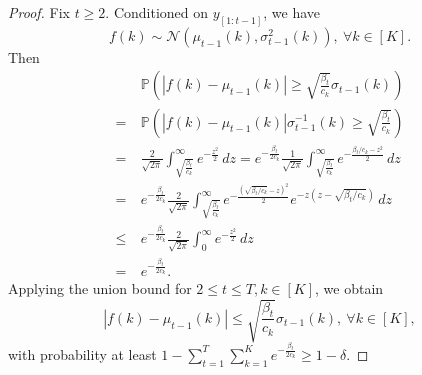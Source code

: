 \documentclass[letterpaper]{vldb}
\newcommand{\cN}{\mathcal{N}}
\newcommand{\bP}{\mathbb{P}} %
\begin{document}
\begin{proof}
  Fix $t\ge 2$. Conditioned on $y_{[1:t-1]}$, we have
  \[
    f(k) \sim \cN(\mu_{t-1}(k), \sigma^2_{t-1}(k)), \ \forall k\in [K].
  \]
  Then
  \begin{align*}
    & \bP\left(|f(k)- \mu_{t-1}(k)| \ge \sqrt{\frac{\beta_t}{c_k}}\sigma_{t-1}(k)\right)\\
    =\ & \bP\left(|f(k)- \mu_{t-1}(k)|\sigma^{-1}_{t-1}(k) \ge \sqrt{\frac{\beta_t}{c_k}}\right)\\
    =\ & \frac{2}{\sqrt{2\pi}}\int_{\sqrt{\frac{\beta_t}{c_k}}}^\infty e^{-\frac{z^2}{2}}\, dz = e^{-\frac{\beta_t}{2c_k}} \frac{1}{\sqrt{2\pi}}\int_{\sqrt{\frac{\beta_t}{c_k}}}^\infty e^{-\frac{\beta_t/c_k-z^2}{2}}\, dz\\
    =\ & e^{-\frac{\beta_t}{2c_k}} \frac{2}{\sqrt{2\pi}}\int_{\sqrt{\frac{\beta_t}{c_k}}}^\infty e^{-\frac{(\sqrt{\beta_t/c_k}-z)^2}{2}}e^{-z(z-\sqrt{\beta_t/c_k})}\, dz\\
    \le \ & e^{-\frac{\beta_t}{2c_k}} \frac{2}{\sqrt{2\pi}} \int_0^\infty e^{-\frac{z^2}{2}}\, dz\\
    =\ & e^{-\frac{\beta_t}{2c_k}}.
  \end{align*}
  Applying the union bound for $2\le t\le T, k\in [K]$, we obtain
  \[
    |f(k) - \mu_{t-1}(k) | \le \sqrt{\frac{\beta_t}{c_k}}\sigma_{t-1}(k),\
    \forall k\in [K],
  \]
  with probability at least $1- \sum_{t=1}^T\sum_{k=1}^K
  e^{-\frac{\beta_t}{2c_k}} \ge  1 - \delta$.
\end{proof}

\vspace{2em}
\end{document}
